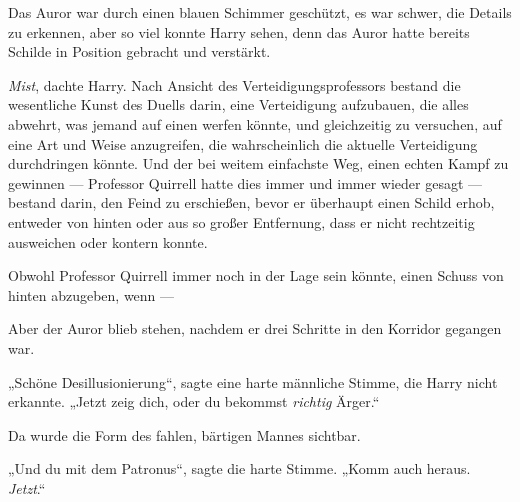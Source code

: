 Das Auror war durch einen blauen Schimmer geschützt, es war schwer, die Details zu erkennen, aber so viel konnte Harry sehen, denn das Auror hatte bereits Schilde in Position gebracht und verstärkt.

\emph{Mist}, dachte Harry. Nach Ansicht des Verteidigungsprofessors bestand die wesentliche Kunst des Duells darin, eine Verteidigung aufzubauen, die alles abwehrt, was jemand auf einen werfen könnte, und gleichzeitig zu versuchen, auf eine Art und Weise anzugreifen, die wahrscheinlich die aktuelle Verteidigung durchdringen könnte. Und der bei weitem einfachste Weg, einen echten Kampf zu gewinnen — Professor Quirrell hatte dies immer und immer wieder gesagt — bestand darin, den Feind zu erschießen, bevor er überhaupt einen Schild erhob, entweder von hinten oder aus so großer Entfernung, dass er nicht rechtzeitig ausweichen oder kontern konnte.

Obwohl Professor Quirrell immer noch in der Lage sein könnte, einen Schuss von hinten abzugeben, wenn —

Aber der Auror blieb stehen, nachdem er drei Schritte in den Korridor gegangen war.

„Schöne Desillusionierung“, sagte eine harte männliche Stimme, die Harry nicht erkannte.
„Jetzt zeig dich, oder du bekommst \emph{richtig} Ärger.“

Da wurde die Form des fahlen, bärtigen Mannes sichtbar.

„Und du mit dem Patronus“, sagte die harte Stimme.
„Komm auch heraus. \emph{Jetzt}.“

